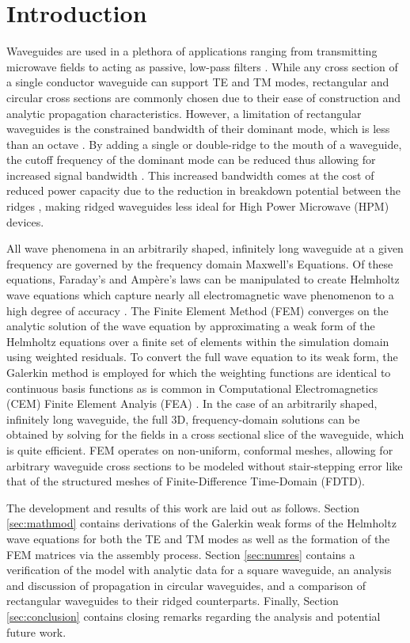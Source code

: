 \section{Introduction}
\label{sec:intro}

Waveguides are used in a plethora of applications ranging from transmitting microwave fields to acting as passive, low-pass filters \cite{pozar2011microwave}. While any cross section of a single conductor waveguide can support TE and TM modes, rectangular and circular cross sections are commonly chosen due to their ease of construction and analytic propagation characteristics. However, a limitation of rectangular waveguides is the constrained bandwidth of their dominant mode, which is less than an octave \cite{pozar2011microwave}. By adding a single or double-ridge to the mouth of a waveguide, the cutoff frequency of the dominant mode can be reduced thus allowing for increased signal bandwidth \cite{pozar2011microwave}. This increased bandwidth comes at the cost of reduced power capacity due to the reduction in breakdown potential between the ridges \cite{pozar2011microwave}, making ridged waveguides less ideal for High Power Microwave (HPM) devices.  

All wave phenomena in an arbitrarily shaped, infinitely long waveguide at a given frequency are governed by the frequency domain Maxwell's Equations. Of these equations, Faraday's and Amp\`{e}re's laws can be manipulated to create Helmholtz wave equations which capture nearly all electromagnetic wave phenomenon to a high degree of accuracy \cite{rothlecnotes}. The Finite Element Method (FEM) converges on the analytic solution of the wave equation by approximating a weak form of the Helmholtz equations over a finite set of elements within the simulation domain using weighted residuals. To convert the full wave equation to its weak form, the Galerkin method is employed for which the weighting functions are identical to continuous basis functions as is common in Computational Electromagnetics (CEM) Finite Element Analyis (FEA) \cite{rothlecnotes}. In the case of an arbitrarily shaped, infinitely long waveguide, the full 3D, frequency-domain solutions can be obtained by solving for the fields in a cross sectional slice of the waveguide, which is quite efficient. FEM operates on non-uniform, conformal meshes, allowing for arbitrary waveguide cross sections to be modeled without stair-stepping error like that of the structured meshes of Finite-Difference Time-Domain (FDTD).

The development and results of this work are laid out as follows. Section \ref{sec:mathmod} contains derivations of the Galerkin weak forms of the Helmholtz wave equations for both the TE and TM modes as well as the formation of the FEM matrices via the assembly process. Section \ref{sec:numres} contains a verification of the model with analytic data for a square waveguide, an analysis and discussion of propagation in circular waveguides, and a comparison of rectangular waveguides to their ridged counterparts. Finally, Section \ref{sec:conclusion} contains closing remarks regarding the analysis and potential future work.